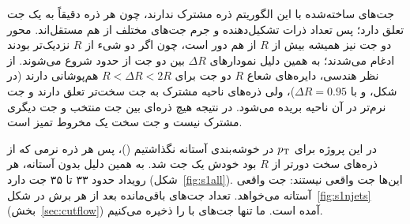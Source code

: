 جت‌های ساخته‌شده با این الگوریتم ذره مشترک ندارند، چون هر ذره دقیقاً به یک جت تعلق دارد؛ پس تعداد ذرات تشکیل‌دهنده و جرم جت‌های مختلف از هم مستقل‌اند. محور دو جت نیز همیشه بیش از $R$ از هم دور است، چون اگر دو شیء از $R$ نزدیک‌تر بودند ادغام می‌شدند؛ به همین دلیل نمودارهای $\Delta R$ بین دو جت از حدود  شروع می‌شوند. از نظر هندسی، دایره‌های شعاع $R$ دو جت برای $R<\Delta R<2R$ هم‌پوشانی دارند (در شکل،  و  با $\Delta R=0.95$)، ولی ذره‌های ناحیه مشترک به جت سخت‌تر تعلق دارند و جت نرم‌تر در آن ناحیه بریده می‌شود. در نتیجه هیچ ذره‌ای بین جت منتخب و جت دیگری مشترک نیست و جت سخت یک مخروط تمیز است.

در این پروژه برای $p_\mathrm{T}$ در خوشه‌بندی آستانه نگذاشتیم ()، پس هر ذره نرمی که از ذره‌های سخت دورتر از $R$ بود خودش یک جت شد. به همین دلیل بدون آستانه، هر رویداد حدود ۳۳ تا ۳۵ جت دارد (شکل~\ref{fig:s1all}). این‌ها جت واقعی نیستند: جت واقعی آستانه می‌خواهد. تعداد جت‌های باقی‌مانده بعد از هر برش در شکل~\ref{fig:s1njets} (بخش~\ref{sec:cutflow}) آمده است. ما تنها جت‌های با  را ذخیره می‌کنیم.
